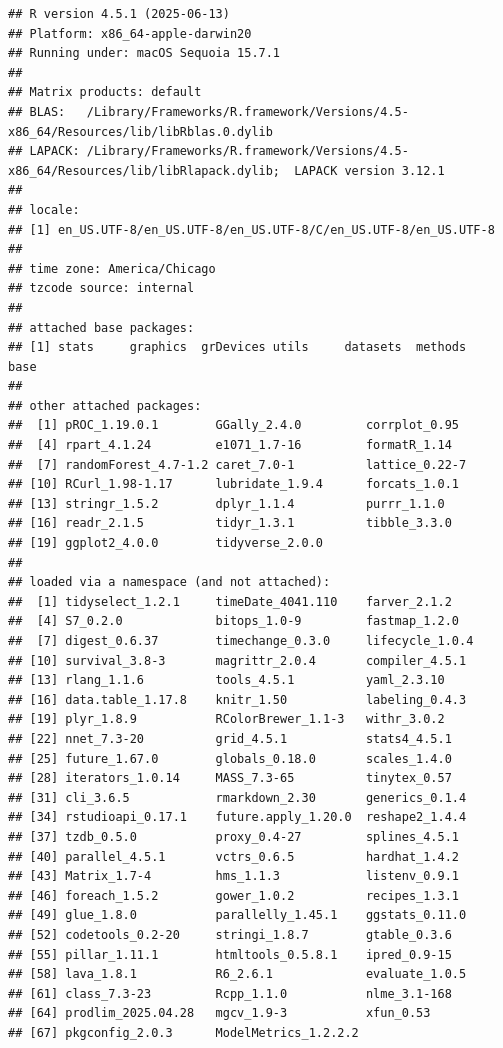 \documentclass[
]{article}
\begin{document}
\begin{verbatim}
## R version 4.5.1 (2025-06-13)
## Platform: x86_64-apple-darwin20
## Running under: macOS Sequoia 15.7.1
## 
## Matrix products: default
## BLAS:   /Library/Frameworks/R.framework/Versions/4.5-x86_64/Resources/lib/libRblas.0.dylib 
## LAPACK: /Library/Frameworks/R.framework/Versions/4.5-x86_64/Resources/lib/libRlapack.dylib;  LAPACK version 3.12.1
## 
## locale:
## [1] en_US.UTF-8/en_US.UTF-8/en_US.UTF-8/C/en_US.UTF-8/en_US.UTF-8
## 
## time zone: America/Chicago
## tzcode source: internal
## 
## attached base packages:
## [1] stats     graphics  grDevices utils     datasets  methods   base     
## 
## other attached packages:
##  [1] pROC_1.19.0.1        GGally_2.4.0         corrplot_0.95       
##  [4] rpart_4.1.24         e1071_1.7-16         formatR_1.14        
##  [7] randomForest_4.7-1.2 caret_7.0-1          lattice_0.22-7      
## [10] RCurl_1.98-1.17      lubridate_1.9.4      forcats_1.0.1       
## [13] stringr_1.5.2        dplyr_1.1.4          purrr_1.1.0         
## [16] readr_2.1.5          tidyr_1.3.1          tibble_3.3.0        
## [19] ggplot2_4.0.0        tidyverse_2.0.0     
## 
## loaded via a namespace (and not attached):
##  [1] tidyselect_1.2.1     timeDate_4041.110    farver_2.1.2        
##  [4] S7_0.2.0             bitops_1.0-9         fastmap_1.2.0       
##  [7] digest_0.6.37        timechange_0.3.0     lifecycle_1.0.4     
## [10] survival_3.8-3       magrittr_2.0.4       compiler_4.5.1      
## [13] rlang_1.1.6          tools_4.5.1          yaml_2.3.10         
## [16] data.table_1.17.8    knitr_1.50           labeling_0.4.3      
## [19] plyr_1.8.9           RColorBrewer_1.1-3   withr_3.0.2         
## [22] nnet_7.3-20          grid_4.5.1           stats4_4.5.1        
## [25] future_1.67.0        globals_0.18.0       scales_1.4.0        
## [28] iterators_1.0.14     MASS_7.3-65          tinytex_0.57        
## [31] cli_3.6.5            rmarkdown_2.30       generics_0.1.4      
## [34] rstudioapi_0.17.1    future.apply_1.20.0  reshape2_1.4.4      
## [37] tzdb_0.5.0           proxy_0.4-27         splines_4.5.1       
## [40] parallel_4.5.1       vctrs_0.6.5          hardhat_1.4.2       
## [43] Matrix_1.7-4         hms_1.1.3            listenv_0.9.1       
## [46] foreach_1.5.2        gower_1.0.2          recipes_1.3.1       
## [49] glue_1.8.0           parallelly_1.45.1    ggstats_0.11.0      
## [52] codetools_0.2-20     stringi_1.8.7        gtable_0.3.6        
## [55] pillar_1.11.1        htmltools_0.5.8.1    ipred_0.9-15        
## [58] lava_1.8.1           R6_2.6.1             evaluate_1.0.5      
## [61] class_7.3-23         Rcpp_1.1.0           nlme_3.1-168        
## [64] prodlim_2025.04.28   mgcv_1.9-3           xfun_0.53           
## [67] pkgconfig_2.0.3      ModelMetrics_1.2.2.2
\end{verbatim}
\end{document}
